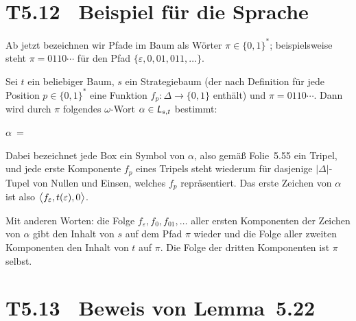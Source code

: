 \documentclass[fontsize=11pt, twoside=false, numbers=autoenddot]{scrbook}
\begin{document}
\section*{T5.12~ {\boldmath Beispiel für die Sprache \Lst}}

Ab jetzt bezeichnen wir Pfade im Baum als Wörter $\pi \in \{0,1\}^*$;
beispielsweise steht $\pi = 0110\cdots$
für den Pfad $\{\varepsilon,0,01,011,\dots\}$.

Sei $t$ ein beliebiger Baum, $s$ ein Strategiebaum (der nach Definition
für jede Position $p \in \{0,1\}^*$ eine Funktion $f_p : \Delta \to \{0,1\}$ enthält)
und $\pi = 0110\cdots$.
Dann wird durch $\pi$ folgendes $\omega$-Wort $\alpha \in \textsf{\textit{L}}_{s,t}$ bestimmt:
%
\begin{center}
  $\alpha ~=~ {}$
  \newcommand{\Tripel}[3]{
    ~\begin{tabular}{@{}c@{}}#1\\[3pt]#2\\[3pt]#3\end{tabular}\,%
  }%
\end{center}
%
Dabei bezeichnet jede Box ein Symbol von $\alpha$, also gemäß Folie~5.55 ein Tripel,
und jede erste Komponente $f_p$ eines Tripels
steht wiederum für dasjenige $|\Delta|$-Tupel von Nullen und Einsen,
welches $f_p$ repräsentiert.
Das erste Zeichen von $\alpha$ ist also $\big\langle f_\varepsilon,t(\varepsilon),0\big\rangle$.

Mit anderen Worten: die Folge $f_\varepsilon,f_0,f_{01},\dots$
aller ersten Komponenten der Zeichen von $\alpha$ gibt den Inhalt von $s$
auf dem Pfad $\pi$ wieder und die Folge aller zweiten Komponenten 
den Inhalt von $t$ auf $\pi$. Die Folge der dritten Komponenten
ist $\pi$ selbst.

\goodbreak
\section*{T5.13~ Beweis von Lemma~5.22}
\end{document}
